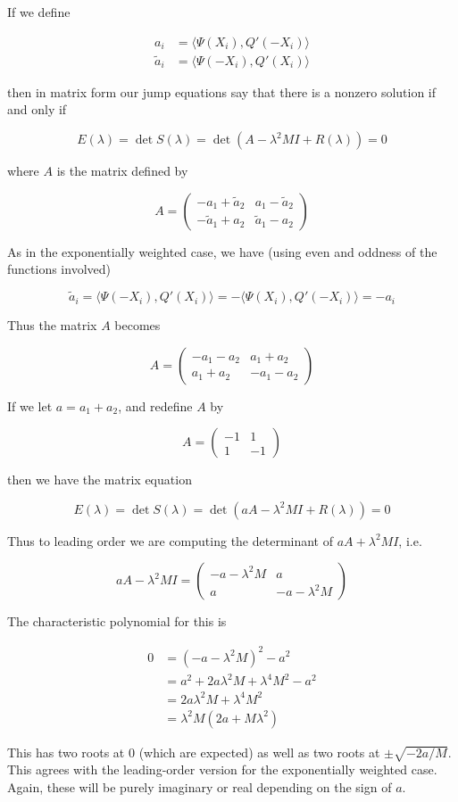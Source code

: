 \documentclass[12pt]{article}
\begin{document}
\begin{enumerate}
If we define

\begin{align*}
a_i &= \langle \Psi (X_i), Q'(-X_i) \rangle \\
\tilde{a}_i &= \langle \Psi(-X_i), Q'(X_i) \rangle
\end{align*}

then in matrix form our jump equations say that there is a nonzero solution if and only if

\[
E(\lambda) = \det S(\lambda) = \det(A - \lambda^2 MI + R(\lambda) ) = 0
\]

where $A$ is the matrix defined by

\[
A = 
\begin{pmatrix}
-a_1 + \tilde{a}_2 & a_1 - \tilde{a}_2 \\
-\tilde{a}_1 + a_2 & \tilde{a}_1 - a_2 
\end{pmatrix}
\]

As in the exponentially weighted case, we have (using even and oddness of the functions involved)

\[
\tilde{a}_i = \langle \Psi(-X_i), Q'(X_i) \rangle = -\langle \Psi(X_i), Q'(-X_i) \rangle = -a_i
\]

Thus the matrix $A$ becomes

\[
A = 
\begin{pmatrix}
-a_1 - a_2 & a_1 + a_2 \\
a_1 + a_2 & -a_1 - a_2 
\end{pmatrix}
\]

If we let $a = a_1 + a_2$, and redefine $A$ by

\[
A = 
\begin{pmatrix}
-1 & 1 \\
1 & -1
\end{pmatrix}
\]

then we have the matrix equation

\[
E(\lambda) = \det S(\lambda) = \det(a A - \lambda^2 MI + R(\lambda) ) = 0
\]

Thus to leading order we are computing the determinant of $a A + \lambda^2 MI$, i.e. 

\[
a A - \lambda^2 MI = 
\begin{pmatrix}
-a - \lambda^2 M & a \\
a & -a - \lambda^2 M
\end{pmatrix}
\]

The characteristic polynomial for this is

\begin{align*}
0 &= (-a - \lambda^2 M)^2 - a^2 \\
&= a^2 + 2 a \lambda^2 M + \lambda^4 M^2 - a^2 \\
&= 2 a \lambda^2 M + \lambda^4 M^2 \\
&= \lambda^2 M (2a + M \lambda^2 )
\end{align*}

This has two roots at 0 (which are expected) as well as two roots at $\pm \sqrt{-2a/M}$. This agrees with the leading-order version for the exponentially weighted case. Again, these will be purely imaginary or real depending on the sign of $a$.

\end{enumerate}
\end{document}
